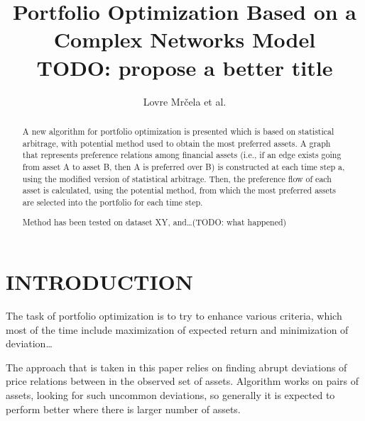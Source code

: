\documentclass[letterpaper, 10 pt, conference]{ieeeconf}
\title{\LARGE \bf Portfolio Optimization Based on a Complex Networks Model\\
  \normalsize TODO: propose a better title}
\author{Lovre Mr\v{c}ela et al.}
\begin{document}
  \maketitle
  \thispagestyle{empty}
  \pagestyle{empty}
    
  \begin{abstract}
    
  A new algorithm for portfolio optimization is presented which is based on statistical arbitrage, with potential method used to obtain the most preferred assets.
  A graph that represents preference relations among financial assets (i.e., if an edge exists going from asset A to asset B, then A is preferred over B) is constructed at each time step a, using the modified version of statistical arbitrage.
  Then, the preference flow of each asset is calculated, using the potential method\cite{caklovic}, from which the most preferred assets are selected into the portfolio for each time step.
  
  Method has been tested on dataset XY, and\dots (TODO: what happened)
  
  \end{abstract}
  
  \section{INTRODUCTION}
  
  The task of portfolio optimization is to try to enhance various criteria, which most of the time include maximization of expected return and minimization of deviation\dots
  
  The approach that is taken in this paper relies on finding abrupt deviations of price relations between in the observed set of assets.
  Algorithm works on pairs of assets, looking for such uncommon deviations, so generally it is expected to perform better where there is larger number of assets.
  
  
  
\end{document}
